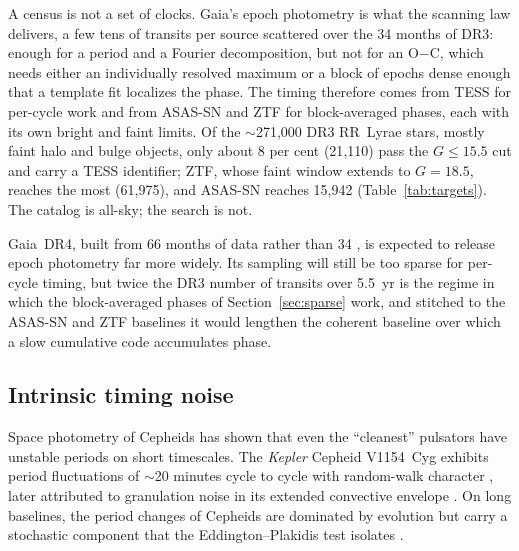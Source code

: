 \documentclass[final,5p]{elsarticle}
\newcommand{\oc}{O$-$C}
\begin{document}
A census is not a set of clocks. Gaia's epoch photometry \citep{Eyer2023} is what the scanning law delivers, a few tens of transits per source scattered over the 34 months of DR3: enough for a period and a Fourier decomposition, but not for an \oc{}, which needs either an individually resolved maximum or a block of epochs dense enough that a template fit localizes the phase. The timing therefore comes from TESS for per-cycle work and from ASAS-SN and ZTF for block-averaged phases, each with its own bright and faint limits. Of the $\sim$271{,}000 DR3 RR~Lyrae stars, mostly faint halo and bulge objects, only about 8 per cent (21{,}110) pass the $G\le15.5$ cut and carry a TESS identifier; ZTF, whose faint window extends to $G=18.5$, reaches the most (61{,}975), and ASAS-SN reaches 15{,}942 (Table~\ref{tab:targets}). The catalog is all-sky; the search is not.

Gaia~DR4, built from 66 months of data rather than 34 \citep{GaiaDR4docs}, is expected to release epoch photometry far more widely. Its sampling will still be too sparse for per-cycle timing, but twice the DR3 number of transits over 5.5~yr is the regime in which the block-averaged phases of Section~\ref{sec:sparse} work, and stitched to the ASAS-SN and ZTF baselines it would lengthen the coherent baseline over which a slow cumulative code accumulates phase.

\subsection{Intrinsic timing noise}
\label{sec:jitter}

Space photometry of Cepheids has shown that even the ``cleanest'' pulsators have unstable periods on short timescales. The \emph{Kepler} Cepheid V1154~Cyg exhibits period fluctuations of $\sim$20 minutes cycle to cycle with random-walk character \citep{Derekas2012}, later attributed to granulation noise in its extended convective envelope \citep{Neilson2014, Derekas2017}. On long baselines, the period changes of Cepheids are dominated by evolution but carry a stochastic component that the Eddington--Plakidis test isolates \citep{Turner2006, Csornyei2022}.
\end{document}
